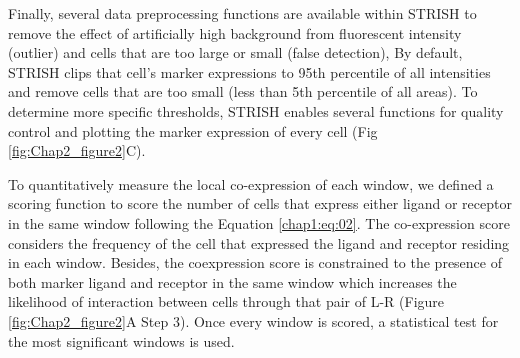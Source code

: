 Finally, several data preprocessing functions are available within STRISH to remove the effect of artificially high background from fluorescent intensity (outlier) and cells that are too large or small (false detection), By default, STRISH clips that cell’s marker expressions to 95th percentile of all intensities and remove cells that are too small (less than 5th percentile of all areas). To determine more specific thresholds, STRISH enables several functions for quality control and plotting the marker expression of every cell (\ie Fig \ref{fig:Chap2_figure2}C).

To quantitatively measure the local co-expression of each window, we defined a scoring function to score the number of cells that express either ligand or receptor in the same window following the Equation \ref{chap1:eq:02}. The co-expression score considers the frequency of the cell that expressed the ligand and receptor residing in each window. Besides, the coexpression score is constrained to the presence of both marker ligand and receptor in the same window which increases the likelihood of interaction between cells through that pair of L-R (Figure \ref{fig:Chap2_figure2}A Step 3). Once every window is scored, a statistical test for the most significant windows is used.     

